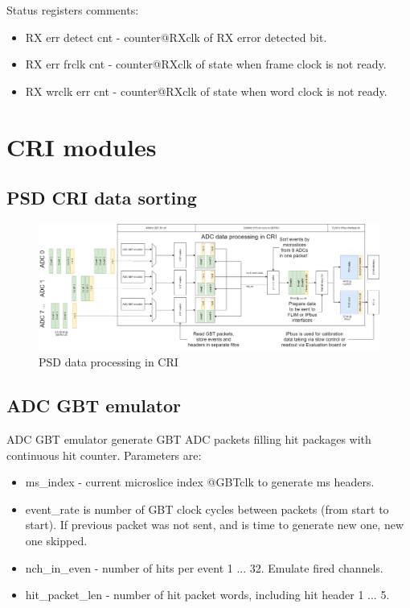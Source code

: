 \documentclass{article}
\begin{document}
Status registers comments:
\begin{itemize}
\item RX err detect cnt - counter@RXclk of RX error detected bit.

\item RX err frclk cnt - counter@RXclk of state when frame clock is not ready.

\item RX wrclk err cnt - counter@RXclk of state when word clock is not ready.


\end{itemize}


\section{CRI modules}

\subsection{PSD CRI data sorting}

\begin{figure}[H]
	\centering 
	\includegraphics[width=1.0\textwidth]{CRI_data_sort.png}
	\caption{\label{fig:11} PSD data processing in CRI}
\end{figure}


\subsection{ADC GBT emulator}

ADC GBT emulator generate GBT ADC packets filling hit packages with continuous hit counter. Parameters are:

\begin{itemize}
\item ms\_index - current microslice index @GBTclk to generate ms headers.


\item  event\_rate is number of GBT clock cycles between packets (from start to start). If previous packet was not sent, and is time to generate new one, new one skipped.

\item nch\_in\_even - number of hits per event 1 ... 32. Emulate fired channels.

\item hit\_packet\_len - number of hit packet words, including hit header 1 ... 5.

\end{itemize}
\end{document}

